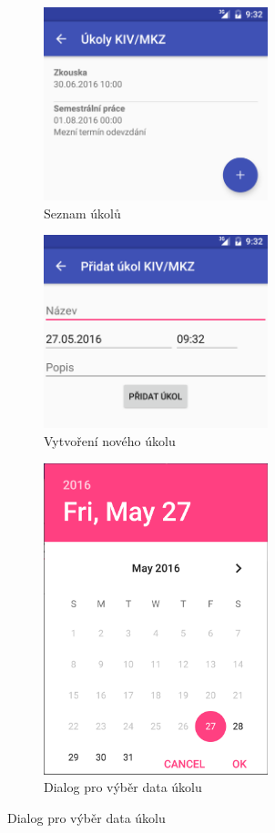 \documentclass[12pt, a4paper]{article}
\begin{document}
			\begin{figure}[ht!]
				\centering
				\caption{Úkoly k~předmětu KIV/MKZ}
				\label{tasks}
				\begin{subfigure}{.5\textwidth}
					\centering
					\caption{Seznam úkolů}
					\label{tasksList}
					\includegraphics[width=6.5cm]{img/tasks.png}
				\end{subfigure}%
				\begin{subfigure}{.5\textwidth}
					\centering
					\caption{Vytvoření nového úkolu}
					\label{addTask}
					\includegraphics[width=6.5cm]{img/addTask.png}
				\end{subfigure}
				\begin{subfigure}{.5\textwidth}
					\centering
					\caption{Dialog pro výběr data úkolu}
					\label{dateDiaog}
					\includegraphics[width=6.5cm]{img/dateDialog.png}

\end{subfigure}
\end{figure}
\end{document}
